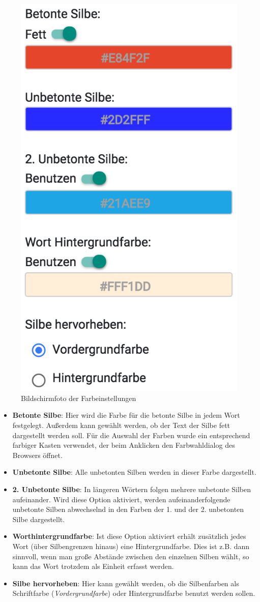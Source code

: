 \begin{figure}[h!]
	\centering
	\includegraphics[width=.4\linewidth, frame]{figures/frontend/config-color}
	\caption{Bildschirmfoto der Farbeinstellungen}
	\label{fig:frontend-colorconf}
\end{figure}

\begin{itemize}
	\item \textbf{Betonte Silbe}: Hier wird die Farbe für die betonte Silbe in jedem Wort festgelegt. Außerdem kann gewählt werden, ob der Text der Silbe fett dargestellt werden soll. Für die Auswahl der Farben wurde ein entsprechend farbiger Kasten verwendet, der beim Anklicken den Farbwahldialog des Browsers öffnet.
	
	\item \textbf{Unbetonte Silbe}: Alle unbetonten Silben werden in dieser Farbe dargestellt.
	
	\item \textbf{2. Unbetonte Silbe}: In längeren Wörtern folgen mehrere unbetonte Silben aufeinander. Wird diese Option aktiviert, werden aufeinanderfolgende unbetonte Silben abwechselnd in den Farben der 1. und der 2. unbetonten Silbe dargestellt.
	
	\item \textbf{Worthintergrundfarbe}: Ist diese Option aktiviert erhält zusätzlich jedes Wort (über Silbengrenzen hinaus) eine Hintergrundfarbe. Dies ist z.B. dann sinnvoll, wenn man große Abstände zwischen den einzelnen Silben wählt, so kann das Wort trotzdem als Einheit erfasst werden.
	
	\item \textbf{Silbe hervorheben}: Hier kann gewählt werden, ob die Silbenfarben als Schriftfarbe (\textit{Vordergrundfarbe}) oder Hintergrundfarbe benutzt werden sollen.
\end{itemize}

